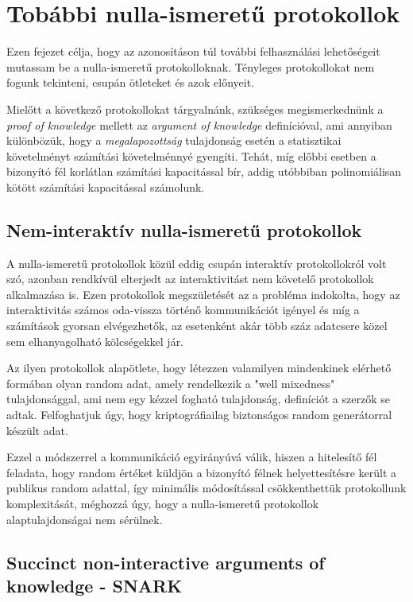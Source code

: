\chapter{Tobábbi nulla-ismeretű protokollok}

Ezen fejezet célja, hogy az azonosításon túl további felhasználási lehetőségeit mutassam be a nulla-ismeretű protokolloknak. Tényleges protokollokat nem fogunk tekinteni, csupán ötleteket és azok előnyeit.

Mielőtt a következő protokollokat tárgyalnánk, szükséges megismerkednünk a \textit{proof of knowledge} mellett az \textit{argument of knowledge} definícióval, ami annyiban különbözük, hogy a \textit{megalapozottság} tulajdonság esetén a statisztikai követelményt számítási követelménnyé gyengíti. Tehát, míg előbbi esetben a bizonyító fél korlátlan számítási kapacitással bír, addig utóbbiban polinomiálisan kötött számítási kapacitással számolunk.

\section{Nem-interaktív nulla-ismeretű protokollok}

A nulla-ismeretű protokollok közül eddig csupán interaktív protokollokról volt szó, azonban rendkívül elterjedt az interaktivitást nem követelő protokollok alkalmazása is. Ezen protokollok megszületését az a probléma indokolta, hogy az interaktivitás számos oda-vissza történő kommunikációt igényel és míg a számítások gyorsan elvégezhetők, az esetenként akár több száz adatcsere közel sem elhanyagolható kölcségekkel jár. 

Az ilyen protokollok \cite{NIZK, NIZK2} alapötlete, hogy létezzen valamilyen mindenkinek elérhető formában olyan random adat, amely rendelkezik a "well mixedness" tulajdonsággal, ami nem egy kézzel fogható tulajdonság, definíciót a szerzők se adtak. Felfoghatjuk úgy, hogy kriptográfiailag biztonságos random generátorral készült adat.

Ezzel a módszerrel a kommunikáció egyirányúvá válik, hiszen a hitelesítő fél feladata, hogy random értéket küldjön a bizonyító félnek helyettesítésre került a publikus random adattal, így minimális módosítással csökkenthettük protokollunk komplexitását, méghozzá úgy, hogy a nulla-ismeretű protokollok alaptulajdonságai nem sérülnek.

\section{Succinct non-interactive arguments of knowledge - SNARK}

